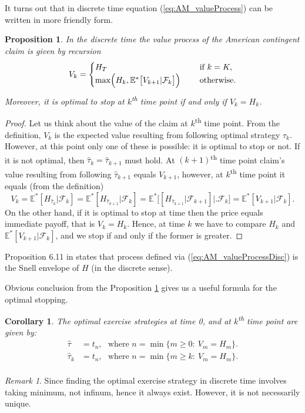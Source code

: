 \documentclass[a4paper,11pt, twoside]{book}
\newtheorem{prop}[thm]{Proposition}
\newtheorem{coro}[thm]{Corollary}
\theoremstyle{definition}
\theoremstyle{remark}
\newtheorem{remark}{Remark}[chapter]
\def\Em{{\mathbb{E}^*}}
\begin{document}
It turns out that in discrete time equation (\ref{eq:AM_valueProcess}) can be written in more friendly form.
\begin{prop}
\label{prop:AM_valueProcessDisc}
 In the discrete time the value process of the American contingent claim is given by recursion
 \begin{equation}
  \label{eq:AM_valueProcessDisc}
  V_{k} = \begin{cases}
             H_T &\text{if } k = K,\\
             \max\Bigl(H_{k}, \Em\bigl[ V_{k+1} | \mathcal{F}_{k} \bigr] \Bigl)\ \ \ \ &\text{otherwise.}
            \end{cases}
 \end{equation}
 Moreover, it is optimal to stop at $k$\textsuperscript{th} time point if and only if $V_{k} = H_{k}$. 
\end{prop}
\begin{proof}
Let us think about the value of the claim at $k$\textsuperscript{th} time point. From the definition, $V_{k}$ is the expected value resulting from following optimal strategy $\hat{\tau}_{k}$. However, at this point only one of these is possible: it is optimal to stop or not. If it is not optimal, then $\hat{\tau}_{k} = \hat{\tau}_{k+1}$ must hold. At $(k+1)$\textsuperscript{th} time point claim's value resulting from following $\hat{\tau}_{k+1}$ equals $V_{k+1}$, however, at $k$\textsuperscript{th} time point it equals (from the definition) 
\[ V_{k} = \Em[H_{\hat{\tau}_{k}} | \mathcal{F}_{k}] = \Em[H_{\hat{\tau}_{k+1}} | \mathcal{F}_{k}] = \Em\bigl[[H_{\hat{\tau}_{k+1}} | \mathcal{F}_{k+1}] \bigl|\bigr. \mathcal{F}_{k} \bigr] = \Em[V_{k+1} | \mathcal{F}_{k}].\]
On the other hand, if it is optimal to stop at time then the price equals immediate payoff, that is $V_{k} = H_{k}$. Hence, at time $k$ we have to compare $H_{k}$ and $\Em[V_{k+1} | \mathcal{F}_{k}]$, and we stop if and only if the former is greater.
\end{proof}
Proposition 6.11 in \cite{follmer} states that process defined via (\ref{eq:AM_valueProcessDisc}) is the Snell envelope of $H$ (in the discrete sense).

Obvious conclusion from the Proposition \ref{prop:AM_valueProcessDisc} gives us a useful formula for the optimal stopping.
\begin{coro}
 \label{coro:AM_optStopDisc}
 The optimal exercise strategies at time 0, and at $k$\textsuperscript{th} time point are given by:
 \begin{equation}
  \label{eq:AM_optStopDisc}
  \begin{split}
   \hat{\tau} &= t_n,\ \ \ \text{where } n = \min\{m \geq 0:\ V_m = H_m \}.\\
   \hat{\tau}_{k} &= t_n,\ \ \ \text{where } n = \min\{m \geq k:\ V_m = H_m \}.\\
  \end{split}
 \end{equation}
\end{coro}
\begin{remark}
 Since finding the optimal exercise strategy in discrete time involves taking minimum, not infinum, hence it always exist. However, it is not necessarily unique.
\end{remark}
\end{document}
